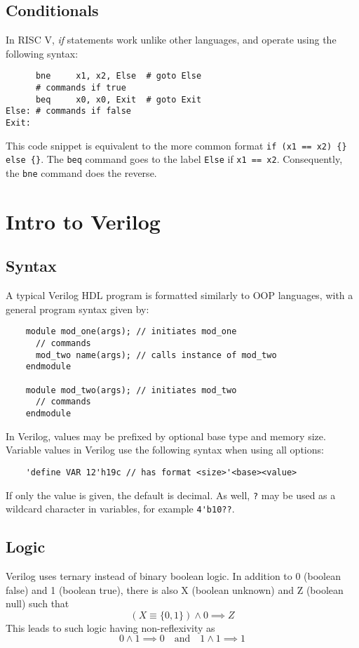 \documentclass[oneside,11pt]{book}
\begin{document}
\section{Conditionals}
In RISC V, \textit{if} statements work unlike other languages, and operate using the following syntax:
\begin{verbatim}
      bne     x1, x2, Else	# goto Else
      # commands if true
      beq     x0, x0, Exit	# goto Exit
Else: # commands if false
Exit:
\end{verbatim}
This code snippet is equivalent to the more common format \verb$if (x1 == x2) {} else {}$. The \verb$beq$ command goes to the label \verb$Else$ if \verb$x1 == x2$. Consequently, the \verb$bne$ command does the reverse.


\chapter{Intro to Verilog}

\section{Syntax}

A typical Verilog HDL program is formatted similarly to OOP languages, with a general program syntax given by:
\begin{verbatim}
	module mod_one(args); // initiates mod_one
	  // commands
	  mod_two name(args); // calls instance of mod_two
	endmodule

	module mod_two(args); // initiates mod_two
	  // commands
	endmodule
\end{verbatim}

In Verilog, values may be prefixed by optional base type and memory size. Variable values in Verilog use the following syntax when using all options:
\begin{verbatim}
	'define VAR 12'h19c // has format <size>'<base><value>
\end{verbatim}
If only the value is given, the default is decimal. As well, \verb|?| may be used as a wildcard character in variables, for example \verb|4'b10??|.

\section{Logic}
Verilog uses ternary instead of binary boolean logic. In addition to 0 (boolean false) and 1 (boolean true), there is also X (boolean unknown) and Z (boolean null) such that \begin{equation}
	(X \equiv \{0, 1\} ) \land 0 \implies Z
\end{equation}
This leads to such logic having non-reflexivity as \begin{equation}
	0 \land 1 \implies 0 \quad\text{and}\quad 1 \land 1 \implies 1
\end{equation}
\end{document}
